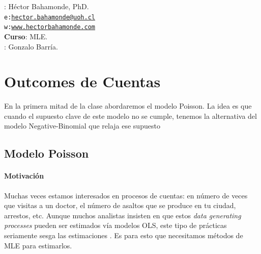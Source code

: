\documentclass[onesided]{article}\usepackage[]{graphicx}\usepackage[]{color}
\begin{document}











\hspace{-5mm}{\bf Profesor}: H\'ector Bahamonde, PhD.\\
\texttt{e:}\href{mailto:hector.bahamonde@uoh.cl}{\texttt{hector.bahamonde@uoh.cl}}\\
\texttt{w:}\href{http://www.hectorbahamonde.com}{\texttt{www.hectorbahamonde.com}}\\
{\bf Curso}: MLE.\\
\hspace{-5mm}{\bf TA}: Gonzalo Barr\'ia.

\section{Outcomes de Cuentas}

En la primera mitad de la clase abordaremos el modelo Poisson. La idea es que cuando el supuesto clave de este modelo no se cumple, tenemos la alternativa del modelo Negative-Binomial que relaja ese supuesto

\subsection{Modelo Poisson}

\paragraph{Motivaci\'on} Muchas veces estamos interesados en procesos de cuentas: en n\'umero de veces que visitas a un doctor, el n\'umero de asaltos que se produce en tu ciudad, arrestos, etc. Aunque muchos analistas insisten en que estos \emph{data generating processes} pueden ser estimados v\'ia modelos OLS, este tipo de pr\'acticas seriamente sesga las estimaciones \parencite[217]{Long:1997wv}. Es para esto que necesitamos m\'etodos de MLE para estimarlos.
\end{document}
